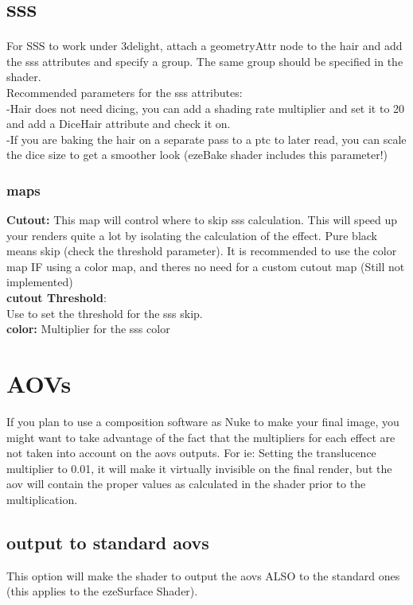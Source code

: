 \documentclass[final,letterpaper,twoside,12pt]{report}
\begin{document}
\section {sss}
For SSS to work under 3delight, attach a geometryAttr node to the hair and add the sss attributes and specify a group.
The same group should be specified in the shader.\\
Recommended parameters for the sss attributes:\\
-Hair does not need dicing, you can add a shading rate multiplier and set it to 20 and add a DiceHair attribute and check it on.\\
-If you are baking the hair on a separate pass to a ptc to later read, you can scale the dice size to get a smoother look (ezeBake shader includes this parameter!)
\subsubsection {maps}
\textbf{Cutout:} This map will control where to skip sss calculation. This will speed up your renders quite a lot by isolating the calculation of the effect. Pure black means skip (check the threshold parameter).
It is recommended to use the color map IF using a color map, and theres no need for a custom cutout map (Still not implemented)\\
\textbf{cutout Threshold}:\\
Use to set the threshold for the sss skip.\\
\textbf{color:} Multiplier for the sss color\\
\smallskip
\section {AOVs}
If you plan to use a composition software as Nuke to make your final image, you might want to take advantage of the fact that the multipliers for each effect are not taken into account on the aovs outputs.
For ie: Setting the translucence multiplier to 0.01, it will make it virtually invisible on the final render, but the aov will contain the proper values as calculated in the shader prior to the multiplication.
\subsection {output to standard aovs}
This option will make the shader to output the aovs ALSO to the standard ones (this applies to the ezeSurface
Shader).
\end{document}
